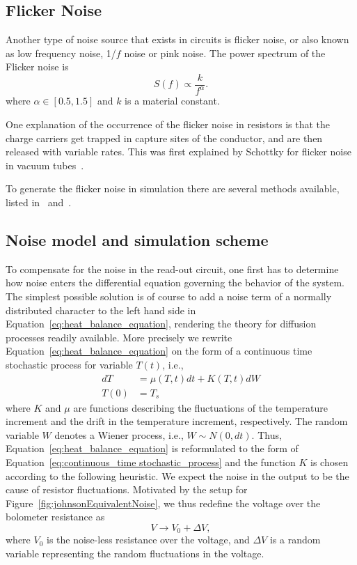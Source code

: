 \subsection{Flicker Noise}\label{sec:flicker-noise}

Another type of noise source that exists in circuits is flicker
noise, or also known as low frequency noise, 1/$f$ noise or pink noise. The power
spectrum of the Flicker noise is
\begin{equation}
  \label{eq:power_spectrum_flicker_noise}
  S(f) \propto \frac{k}{f^{\alpha}}.
\end{equation}
where $\alpha \in [0.5, 1.5]$ and $k$ is a material constant.

One explanation of the occurrence of the flicker noise in resistors is
that the charge carriers get trapped in capture sites of the
conductor, and are then released with variable rates. This was first
explained by Schottky for flicker noise in vacuum tubes~\cite{PhysRev.28.74}.

To generate the flicker noise in simulation there are several methods
available, listed in~\cite{381848} and~\cite{Stoyanov_2011}.

\subsection{Noise model and simulation scheme}

To compensate for the noise in the read-out circuit, one first has to
determine how noise enters the differential equation governing the
behavior of the system. The simplest possible solution is of course to
add a noise term of a normally distributed character to the left hand side
in Equation~\eqref{eq:heat_balance_equation}, rendering the theory for
diffusion processes readily available. More precisely we rewrite
Equation~\eqref{eq:heat_balance_equation} on the form of a continuous
time stochastic process for variable $T(t)$, i.e.,
\begin{align} \label{eq:continuous_time stochastic_process}
 dT&= \mu(T,t)dt  + K(T,t)dW \\
 T(0)&=T_s	\nonumber
\end{align}
where $K$ and $\mu$ are functions describing the fluctuations of the temperature
increment and the drift in the temperature increment,
respectively. The random variable $W$ denotes a Wiener process, i.e.,
$W \sim N(0, dt)$. Thus, Equation~\eqref{eq:heat_balance_equation} is
reformulated to the form of Equation~\eqref{eq:continuous_time
  stochastic_process} and the function $K$ is chosen according to
the following heuristic.
We expect the noise in the output to be the cause of resistor fluctuations.
Motivated by the setup for Figure~\ref{fig:johnsonEquivalentNoise}, we thus redefine the voltage over
the bolometer resistance as
\begin{equation}
  \label{eq:randomvariable_transformation}
  V \rightarrow V_0 + \Delta V,
\end{equation}
where $V_0$ is the noise-less resistance over the voltage, and $\Delta
V$ is a random variable representing the random fluctuations in the
voltage.

